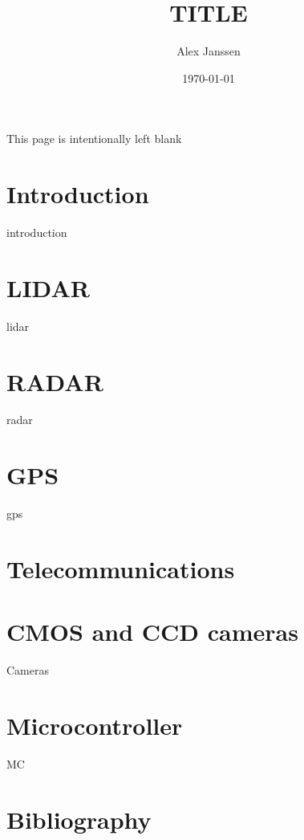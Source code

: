 \documentclass[parskip=full,11pt,a4paper,titlepage]{article}
\title{TITLE}
\author{Alex Janssen}
\date{\today}
\begin{document}



\clearpage

\begin{center}
This page is intentionally left blank
\end{center}
\clearpage



\tableofcontents
\clearpage

\section{Introduction}
{introduction}
\clearpage

\section{LIDAR}
{lidar}
\clearpage

\section{RADAR}
{radar}

\section{GPS}
{gps}
\clearpage

\section{Telecommunications}

\section{CMOS and CCD cameras}
{Cameras}
\clearpage

\section{Microcontroller}
{MC}
\clearpage

\section{Bibliography}








\end{document}
